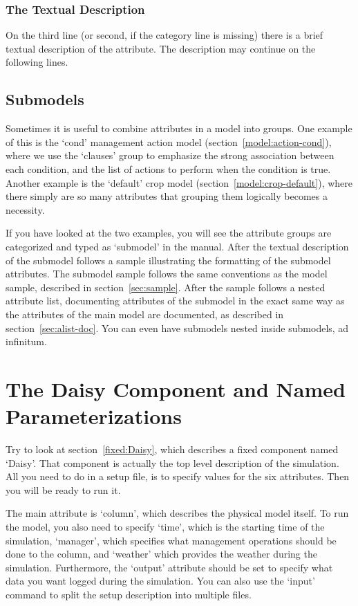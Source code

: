 \subsubsection{The Textual Description}

On the third line (or second, if the category line is missing) there
is a brief textual description of the attribute.  The description may
continue on the following lines.

\subsection{Submodels}

Sometimes it is useful to combine attributes in a model into groups.
One example of this is the `cond' management action model
(section~\ref{model:action-cond}), where we use the `clauses' group to
emphasize the strong association between each condition, and the list
of actions to perform when the condition is true.  Another example is
the `default' crop model (section~\ref{model:crop-default}), where
there simply are so many attributes that grouping them logically
becomes a necessity.

If you have looked at the two examples, you will see the attribute
groups are categorized and typed as `submodel' in the manual.  After
the textual description of the submodel follows a sample illustrating
the formatting of the submodel attributes.  The submodel sample
follows the same conventions as the model sample, described in
section~\ref{sec:sample}.  After the sample follows a nested attribute
list, documenting attributes of the submodel in the exact same way as
the attributes of the main model are documented, as described in
section~\ref{sec:alist-doc}.  You can even have submodels nested
inside submodels, ad infinitum.

\section{The Daisy Component and Named Parameterizations}
\label{sec:daisy}

Try to look at section~\ref{fixed:Daisy}, which describes a fixed
component named `Daisy'.  That component is actually the top level
description of the simulation.  All you need to do in a setup file, is
to specify values for the six attributes.  Then you will be ready to
run it.

The main attribute is `column', which describes the physical model
itself.  To run the model, you also need to specify `time', which is
the starting time of the simulation, `manager', which specifies what
management operations should be done to the column, and `weather'
which provides the weather during the simulation.  Furthermore, the
`output' attribute should be set to specify what data you want logged
during the simulation.  You can also use the `input' command to split
the setup description into multiple files. 

